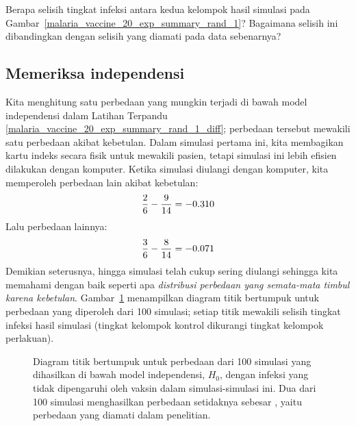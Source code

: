 \begin{exercisewrap}
\begin{nexercise}
\label{malaria_vaccine_20_exp_summary_rand_1_diff}
Berapa selisih tingkat infeksi antara
kedua kelompok hasil simulasi pada
Gambar~\ref{malaria_vaccine_20_exp_summary_rand_1}?
Bagaimana selisih ini dibandingkan dengan selisih
\malariaIRDiffPerc{} yang diamati
pada data sebenarnya?\footnotemark{}
\end{nexercise}
\end{exercisewrap}


\subsection{Memeriksa independensi}

Kita menghitung satu perbedaan yang mungkin terjadi di bawah
model independensi dalam Latihan Terpandu
\ref{malaria_vaccine_20_exp_summary_rand_1_diff};
perbedaan tersebut mewakili satu perbedaan akibat kebetulan.
Dalam simulasi pertama ini, kita membagikan kartu indeks
secara fisik untuk mewakili pasien, tetapi simulasi ini
lebih efisien dilakukan dengan komputer.
Ketika simulasi diulangi dengan komputer, kita memperoleh
perbedaan lain akibat kebetulan:
\begin{align*}
\frac{2}{6{}} - \frac{9}{14{}} = -0.310
\end{align*}
Lalu perbedaan lainnya:
\begin{align*}
\frac{3}{6{}} - \frac{8}{14{}} = -0.071
\end{align*}
Demikian seterusnya, hingga simulasi telah cukup sering
diulangi sehingga kita memahami dengan baik seperti apa
\emph{distribusi perbedaan yang semata-mata timbul karena kebetulan}.
Gambar~\ref{malaria_rand_dot_plot} menampilkan diagram titik bertumpuk
untuk perbedaan yang diperoleh dari 100 simulasi;
setiap titik mewakili selisih tingkat infeksi hasil simulasi
(tingkat kelompok kontrol dikurangi tingkat kelompok perlakuan).

\begin{figure}[ht]
  \centering
  \caption{Diagram titik bertumpuk untuk perbedaan dari
      100 simulasi yang dihasilkan di bawah model independensi,
      $H_0$, dengan infeksi yang tidak dipengaruhi oleh vaksin
      dalam simulasi-simulasi ini.
      Dua dari 100 simulasi menghasilkan perbedaan setidaknya
      sebesar \malariaIRDiffPerc{}, yaitu perbedaan yang diamati
      dalam penelitian.}
  \label{malaria_rand_dot_plot}
\end{figure}

